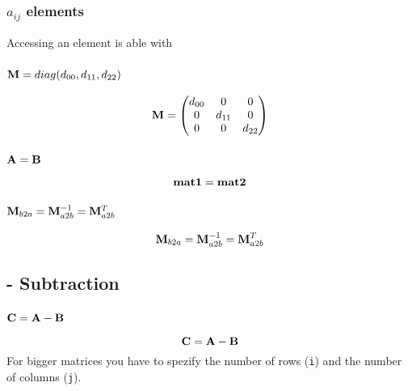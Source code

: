 \subsubsection*{$a_{ij}$ elements}
Accessing an element is able with

\subsubsection*{$\mat M = diag(d_{00}, d_{11}, d_{22})$}
\begin{equation}
\mat M = \begin{pmatrix}
d_{00} & 0 & 0 \\
0 & d_{11} & 0 \\
0 & 0 & d_{22}
\end{pmatrix}
\end{equation}

\subsubsection*{$\mat{A} = \mat{B}$}
\begin{equation}
\mat {mat1} = \mat {mat2}
\end{equation}


\subsubsection*{$\mat M_{b2a} = \inv{\mat M_{a2b}} = \transp{\mat M_{a2b}}$}
\begin{equation}
\mat M_{b2a} = \inv{\mat M_{a2b}} = \transp{\mat M_{a2b}}
\end{equation}

\subsection{- Subtraction}
\subsubsection*{$\mat C = \mat A - \mat B$}
\begin{equation}
\mat C = \mat A - \mat B
\end{equation}
For bigger matrices you have to spezify the number of rows (\texttt{i}) and the number of columns (\texttt{j}).



